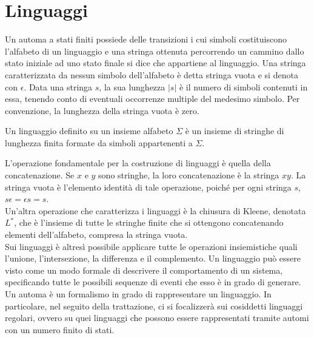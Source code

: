 \newpage
\section{Linguaggi}
Un automa a stati finiti possiede delle transizioni i cui simboli costituiscono l'alfabeto di un linguaggio e una stringa ottenuta percorrendo un cammino dallo stato iniziale ad uno stato finale si dice che appartiene al linguaggio. Una stringa caratterizzata da nessun simbolo dell'alfabeto è detta stringa vuota e si denota con $\epsilon$.
Data una stringa $s$, la sua lunghezza $|s|$ è il numero di simboli contenuti in essa, tenendo conto di eventuali occorrenze multiple del medesimo simbolo. Per convenzione, la lunghezza della stringa vuota è zero.
\begin{defn}
Un linguaggio definito su un insieme alfabeto $\Sigma$ è un insieme di stringhe di lunghezza finita formate da simboli appartenenti a $\Sigma$.
\end{defn}
L'operazione fondamentale per la costruzione di linguaggi è quella della concatenazione. Se $x$ e $y$ sono stringhe, la loro concatenazione è la stringa $xy$. La stringa vuota è l'elemento identità di tale operazione, poiché per ogni stringa $s$, $s\epsilon = \epsilon s = s$.\\
Un'altra operazione che caratterizza i linguaggi è la chiusura di Kleene, denotata $L^*$, che è l'insieme di tutte le stringhe finite che si ottengono concatenando elementi dell'alfabeto, compresa la stringa vuota.\\
Sui linguaggi è altresì possibile applicare tutte le operazioni insiemistiche quali l'unione, l'intersezione, la differenza e il complemento.
Un linguaggio può essere visto come un modo formale di descrivere il comportamento di un sistema, specificando tutte le possibili sequenze di eventi che esso è in grado di generare. 
Un automa è un formalismo in grado di rappresentare un linguaggio.
In particolare, nel seguito della trattazione, ci si focalizzerà sui cosiddetti linguaggi regolari, ovvero su quei linguaggi che possono essere rappresentati tramite automi con un numero finito di stati.

